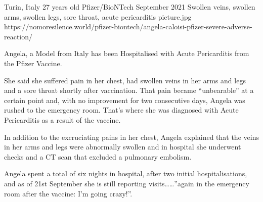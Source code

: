 {Turin, Italy}
{27 years old}
{Pfizer/BioNTech}
{September 2021}
{Swollen veins, swollen arms, swollen legs, sore throat, acute pericarditis}
{picture.jpg}
{https://nomoresilence.world/pfizer-biontech/angela-caloisi-pfizer-severe-adverse-reaction/}
{

Angela, a Model from Italy has been Hospitalised with Acute Pericarditis from
the Pfizer Vaccine.

She said she suffered pain in her chest, had swollen veins in her arms and legs
and a sore throat shortly after vaccination. That pain became “unbearable” at a
certain point and, with no improvement for two consecutive days, Angela was
rushed to the emergency room. That’s where she was diagnosed with Acute
Pericarditis as a result of the vaccine.

In addition to the excruciating pains in her chest, Angela explained that the
veins in her arms and legs were abnormally swollen and in hospital she underwent
checks and a CT scan that excluded a pulmonary embolism.

Angela spent a total of six nights in hospital, after two initial
hospitalisations, and as of 21st September she is still reporting visits……”again
in the emergency room after the vaccine: I’m going crazy!”.

}
